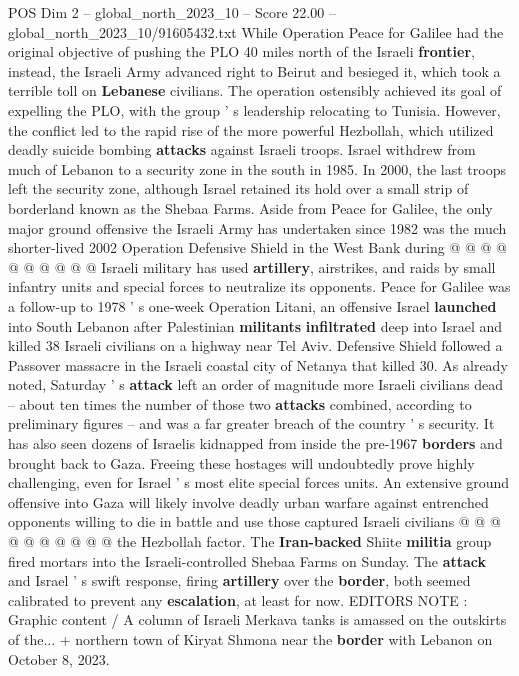 \begin{textsample}{POS Dim 2 – global\_north\_2023\_10 – Score 22.00 – global\_north\_2023\_10/91605432.txt}
While Operation Peace for Galilee had the original objective of pushing the PLO 40 miles north of the Israeli \textbf{frontier}, instead, the Israeli Army advanced right to Beirut and besieged it, which took a terrible toll on \textbf{Lebanese} civilians.
The operation ostensibly achieved its goal of expelling the PLO, with the group ' s leadership relocating to Tunisia.
However, the conflict led to the rapid rise of the more powerful Hezbollah, which utilized deadly suicide bombing \textbf{attacks} against Israeli troops.
Israel withdrew from much of Lebanon to a security zone in the south in 1985.
In 2000, the last troops left the security zone, although Israel retained its hold over a small strip of borderland known as the Shebaa Farms.
Aside from Peace for Galilee, the only major ground offensive the Israeli Army has undertaken since 1982 was the much shorter-lived 2002 Operation Defensive Shield in the West Bank during @ @ @ @ @ @ @ @ @ @ Israeli military has used \textbf{artillery}, airstrikes, and raids by small infantry units and special forces to neutralize its opponents.
Peace for Galilee was a follow-up to 1978 ' s one-week Operation Litani, an offensive Israel \textbf{launched} into South Lebanon after Palestinian \textbf{militants} \textbf{infiltrated} deep into Israel and killed 38 Israeli civilians on a highway near Tel Aviv.
Defensive Shield followed a Passover massacre in the Israeli coastal city of Netanya that killed 30.
As already noted, Saturday ' s \textbf{attack} left an order of magnitude more Israeli civilians dead -- about ten times the number of those two \textbf{attacks} combined, according to preliminary figures -- and was a far greater breach of the country ' s security.
It has also seen dozens of Israelis kidnapped from inside the pre-1967 \textbf{borders} and brought back to Gaza.
Freeing these hostages will undoubtedly prove highly challenging, even for Israel ' s most elite special forces units.
An extensive ground offensive into Gaza will likely involve deadly urban warfare against entrenched opponents willing to die in battle and use those captured Israeli civilians @ @ @ @ @ @ @ @ @ @ the Hezbollah factor.
The \textbf{Iran-backed} Shiite \textbf{militia} group fired mortars into the Israeli-controlled Shebaa Farms on Sunday.
The \textbf{attack} and Israel ' s swift response, firing \textbf{artillery} over the \textbf{border}, both seemed calibrated to prevent any \textbf{escalation}, at least for now.
EDITORS NOTE : Graphic content / A column of Israeli Merkava tanks is amassed on the outskirts of the... + northern town of Kiryat Shmona near the \textbf{border} with Lebanon on October 8, 2023.

\end{textsample}
